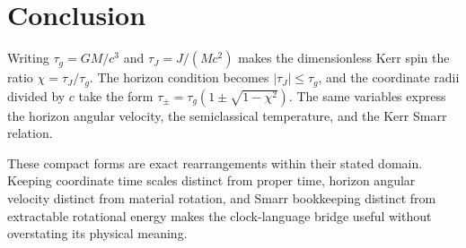 \documentclass[12pt]{article}
\begin{document}
\section{Conclusion}

Writing $\tau_g=GM/c^3$ and $\tau_J=J/(Mc^2)$ makes the dimensionless Kerr spin the ratio $\chi=\tau_J/\tau_g$. The horizon condition becomes $|\tau_J|\leq\tau_g$, and the coordinate radii divided by $c$ take the form $\tau_\pm=\tau_g(1\pm\sqrt{1-\chi^2})$. The same variables express the horizon angular velocity, the semiclassical temperature, and the Kerr Smarr relation.

These compact forms are exact rearrangements within their stated domain. Keeping coordinate time scales distinct from proper time, horizon angular velocity distinct from material rotation, and Smarr bookkeeping distinct from extractable rotational energy makes the clock-language bridge useful without overstating its physical meaning.
\end{document}
